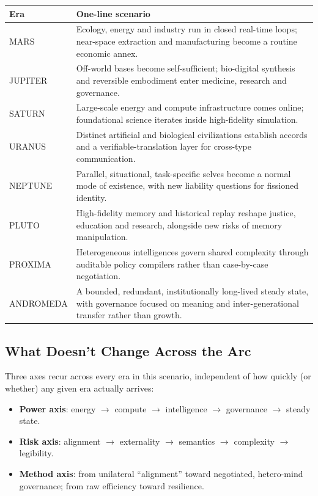 \documentclass[11pt,oneside]{article}
\begin{document}
\begin{longtable}{@{}p{}p{}@{}}
\toprule
\textbf{Era} & \textbf{One-line scenario} \\\midrule
MARS & Ecology, energy and industry run in closed real-time loops; near-space extraction and manufacturing become a routine economic annex. \\
JUPITER & Off-world bases become self-sufficient; bio-digital synthesis and reversible embodiment enter medicine, research and governance. \\
SATURN & Large-scale energy and compute infrastructure comes online; foundational science iterates inside high-fidelity simulation. \\
URANUS & Distinct artificial and biological civilizations establish accords and a verifiable-translation layer for cross-type communication. \\
NEPTUNE & Parallel, situational, task-specific selves become a normal mode of existence, with new liability questions for fissioned identity. \\
PLUTO & High-fidelity memory and historical replay reshape justice, education and research, alongside new risks of memory manipulation. \\
PROXIMA & Heterogeneous intelligences govern shared complexity through auditable policy compilers rather than case-by-case negotiation. \\
ANDROMEDA & A bounded, redundant, institutionally long-lived steady state, with governance focused on meaning and inter-generational transfer rather than growth. \\\bottomrule
\end{longtable}

\subsection{What Doesn't Change Across the Arc}

Three axes recur across every era in this scenario, independent of how quickly (or whether)
any given era actually arrives:

\begin{itemize}[noitemsep]
  \item \textbf{Power axis}: energy $\rightarrow$ compute $\rightarrow$ intelligence
  $\rightarrow$ governance $\rightarrow$ steady state.
  \item \textbf{Risk axis}: alignment $\rightarrow$ externality $\rightarrow$ semantics
  $\rightarrow$ complexity $\rightarrow$ legibility.
  \item \textbf{Method axis}: from unilateral ``alignment'' toward negotiated, hetero-mind
  governance; from raw efficiency toward resilience.
\end{itemize}
\end{document}
